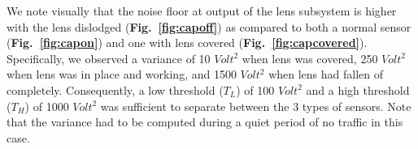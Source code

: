 We note visually that the noise floor at output of the lens subsystem is higher with the lens dislodged ({\bfseries Fig.~\ref{fig:capoff}}) as compared to both a normal sensor ({\bfseries Fig.~\ref{fig:capon}}) and one with lens covered ({\bfseries Fig.~\ref{fig:capcovered}}). Specifically, we observed a variance of 10 $Volt^2$ when lens was covered, 250 $Volt^2$ when lens was in place and working, and 1500 $Volt^2$ when lens had fallen of completely. Consequently, a low threshold ($T_L$) of 100 $Volt^2$ and a high threshold ($T_H$) of 1000 $Volt^2$ was sufficient to separate between the 3 types of sensors. Note that the variance had to be computed during a quiet period of no traffic in this case. %



